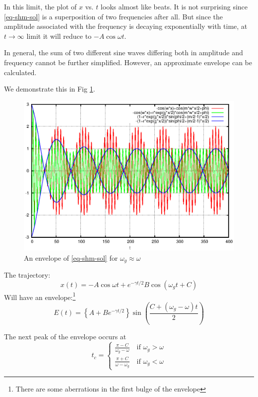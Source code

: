\documentclass{book}
\renewcommand{\(}{\begin{columns}}
\renewcommand{\)}{\end{columns}}
\newcommand{\<}[1]{\begin{column}{#1}}
\renewcommand{\>}{\end{column}}
\begin{document}
In  this limit, the plot of $x$ vs.  $t$ looks almost like beats.  It is not surprising since 
\eqref{eq-shm-sol} is a superposition of two frequencies after all.   But since the amplitude associated with the 
frequency  is decaying exponentially with time, at $t\to\infty$ limit it will 
reduce to $-A\cos{\omega t}$.  

In general, the sum of two different sine waves differing both in amplitude 
and frequency cannot be further simplified.  However, an approximate envelope 
can be calculated.  

We demonstrate this in Fig \ref{fig-envelope-beats}. 

\begin{figure}[!htb]
\begin{center}
\caption{An envelope of \eqref{eq-shm-sol} for $\omega_g\approx \omega$}
\label{fig-envelope-beats}
\includegraphics[width=0.8\columnwidth]{guess_envelope}
\end{center}
\end{figure}



The trajectory:
\begin{equation}
x(t)=-A\cos{\omega t}+e^{-\gamma t/2}B\cos{\left(\omega_g t+C\right)}
\end{equation}
Will have an envelope:\footnote{There are some aberrations in the first bulge 
of the envelope}
\begin{equation}
\label{eq-envelope}
E(t)=\left\{A+Be^{-\gamma t/2}\right\}\sin{\left( \frac{C+(\omega_g-\omega)t}{2} \right)}
\end{equation}


The next peak of the envelope occurs at
\begin{equation}
\label{eq-tcol}
t_c= \left\{
\begin{matrix}
\frac{\pi-C}{\omega_g-\omega}\hspace{1em} \text{if }\omega_g>\omega\\
\frac{\pi+C}{\omega-\omega_g}\hspace{1em} \text{if }\omega_g<\omega
\end{matrix}
\right.  
\end{equation}
\end{document}
